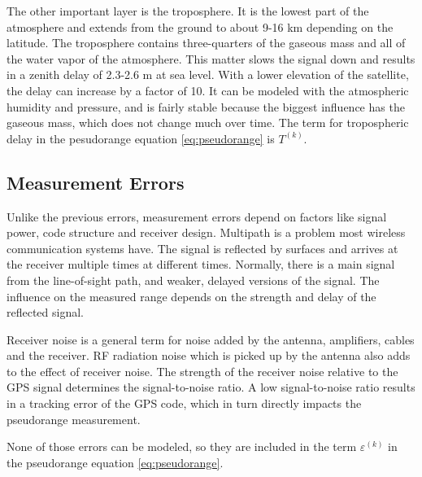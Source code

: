 The other important layer is the troposphere.
It is the lowest part of the atmosphere and extends from the ground to about 9-16 km depending on the latitude.
The troposphere contains three-quarters of the gaseous mass and all of the water vapor of the atmosphere.
This matter slows the signal down and results in a zenith delay of 2.3-2.6 m at sea level.
With a lower elevation of the satellite, the delay can increase by a factor of 10.
It can be modeled with the atmospheric humidity and pressure, and is fairly stable because the biggest influence has the gaseous mass, which does not change much over time.
The term for tropospheric delay in the pesudorange equation \ref{eq:pseudorange} is $T^{(k)}$.

\subsection{Measurement Errors}

Unlike the previous errors, measurement errors depend on factors like signal power, code structure and receiver design.
Multipath is a problem most wireless communication systems have.
The signal is reflected by surfaces and arrives at the receiver multiple times at different times.
Normally, there is a main signal from the line-of-sight path, and weaker, delayed versions of the signal.
The influence on the measured range depends on the strength and delay of the reflected signal.

Receiver noise is a general term for noise added by the antenna, amplifiers, cables and the receiver.
RF radiation noise which is picked up by the antenna also adds to the effect of receiver noise.
The strength of the receiver noise relative to the GPS signal determines the signal-to-noise ratio.
A low signal-to-noise ratio results in a tracking error of the GPS code, which in turn directly impacts the pseudorange measurement.

None of those errors can be modeled, so they are included in the term $\varepsilon^{(k)}$ in the pseudorange equation \ref{eq:pseudorange}. \cite{misra2011global}

